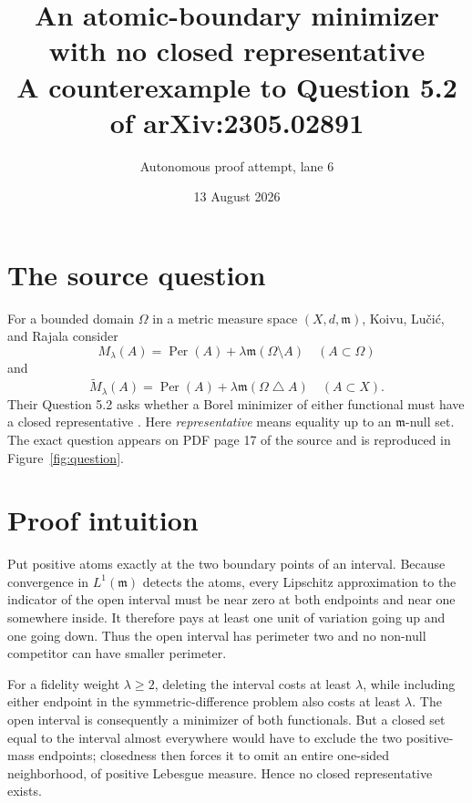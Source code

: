 \documentclass[11pt]{article}
\title{An atomic-boundary minimizer with no closed representative\\
\large A counterexample to Question 5.2 of arXiv:2305.02891}
\author{Autonomous proof attempt, lane 6}
\date{13 August 2026}
\newcommand{\Per}{\operatorname{Per}}
\begin{document}
\maketitle

\begin{center}
\end{center}

\section{The source question}

For a bounded domain $\Omega$ in a metric measure space
$(X,d,\mathfrak m)$, Koivu, Lu\v ci\'c, and Rajala consider
\[
 M_\lambda(A)=\Per(A)+\lambda\mathfrak m(\Omega\setminus A)
 \quad(A\subset\Omega)
\]
and
\[
 \widetilde M_\lambda(A)
 =\Per(A)+\lambda\mathfrak m(\Omega\mathbin\triangle A)
 \quad(A\subset X).
\]
Their Question 5.2 asks whether a Borel minimizer of either functional must
have a closed representative \cite[Question 5.2]{KLR}.  Here
\emph{representative} means equality up to an $\mathfrak m$-null set.  The
exact question appears on PDF page 17 of the source and is reproduced in
Figure~\ref{fig:question}.

\section{Proof intuition}

Put positive atoms exactly at the two boundary points of an interval.
Because convergence in $L^1(\mathfrak m)$ detects the atoms, every Lipschitz
approximation to the indicator of the open interval must be near zero at both
endpoints and near one somewhere inside.  It therefore pays at least one unit
of variation going up and one going down.  Thus the open interval has
perimeter two and no non-null competitor can have smaller perimeter.

For a fidelity weight $\lambda\ge2$, deleting the interval costs at least
$\lambda$, while including either endpoint in the symmetric-difference
problem also costs at least $\lambda$.  The open interval is consequently a
minimizer of both functionals.  But a closed set equal to the interval almost
everywhere would have to exclude the two positive-mass endpoints; closedness
then forces it to omit an entire one-sided neighborhood, of positive Lebesgue
measure.  Hence no closed representative exists.
\end{document}

